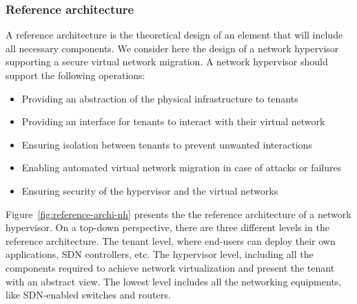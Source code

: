 \subsubsection{Reference architecture}
\label{sec:reference_archi}
A reference architecture is the theoretical design of an element that will include all necessary components. 
We consider here the design of a network hypervisor supporting a secure virtual network migration.
A network hypervisor should support the following operations:
\begin{itemize}
    \item Providing an abstraction of the physical infrastructure to tenants
    \item Providing an interface for tenants to interact with their virtual network
    \item Ensuring isolation between tenants to prevent unwanted interactions 
    \item Enabling automated virtual network migration in case of attacks or failures
    \item Ensuring security of the hypervisor and the virtual networks
\end{itemize}



  
Figure~\ref{fig:reference-archi-nh} presents the the reference architecture of a network hypervisor.
On a top-down perspective, there are three different levels in the reference architecture.
The tenant level, where end-users can deploy their own applications, SDN controllers, etc.
The hypervisor level, including all the components required to achieve network virtualization and present the tenant with an abstract view.
The lowest level includes all the networking equipments, like SDN-enabled switches and routers.

